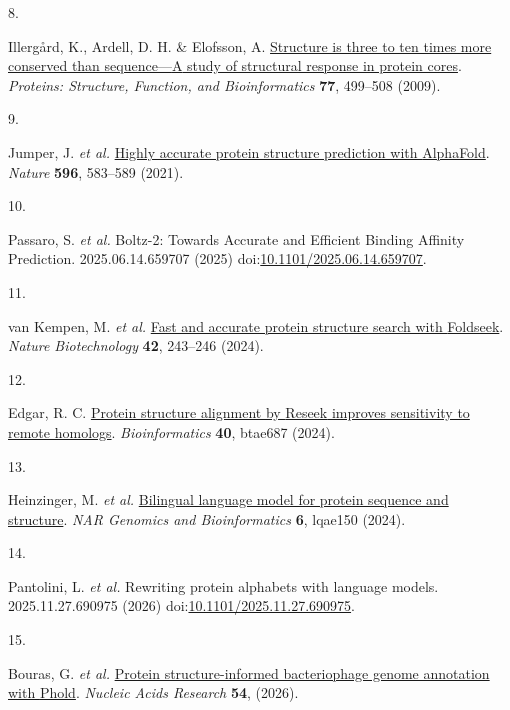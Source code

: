 \documentclass[
  sn-nature,
]{sn-jnl}
\newlength{\cslhangindent}
\newlength{\csllabelwidth}
\newenvironment{CSLReferences}[2] %
 {\begin{list}{}{%
  \setlength{\itemindent}{0pt}
  \setlength{\leftmargin}{0pt}
  \setlength{\parsep}{0pt}
  \ifodd #1
   \setlength{\leftmargin}{\cslhangindent}
   \setlength{\itemindent}{-1\cslhangindent}
  \fi
  \setlength{\itemsep}{#2\baselineskip}}}
 {\end{list}}
\newcommand{\CSLLeftMargin}[1]{\parbox[t]{\csllabelwidth}{\strut#1\strut}}
\newcommand{\CSLRightInline}[1]{\parbox[t]{\linewidth - \csllabelwidth}{\strut#1\strut}}
\begin{document}
\begin{CSLReferences}{0}{0}
\CSLLeftMargin{8. }%
\CSLRightInline{Illergård, K., Ardell, D. H. \& Elofsson, A.
\href{https://doi.org/10.1002/prot.22458}{Structure is three to ten
times more conserved than sequence---{A} study of structural response in
protein cores}. \emph{Proteins: Structure, Function, and Bioinformatics}
\textbf{77}, 499--508 (2009).}

\CSLLeftMargin{9. }%
\CSLRightInline{Jumper, J. \emph{et al.}
\href{https://doi.org/10.1038/s41586-021-03819-2}{Highly accurate
protein structure prediction with {AlphaFold}}. \emph{Nature}
\textbf{596}, 583--589 (2021).}

\CSLLeftMargin{10. }%
\CSLRightInline{Passaro, S. \emph{et al.} Boltz-2: {Towards Accurate}
and {Efficient Binding Affinity Prediction}. 2025.06.14.659707 (2025)
doi:\href{https://doi.org/10.1101/2025.06.14.659707}{10.1101/2025.06.14.659707}.}

\CSLLeftMargin{11. }%
\CSLRightInline{{van Kempen, M. \emph{et al.}}
\href{https://doi.org/10.1038/s41587-023-01773-0}{Fast and accurate
protein structure search with {Foldseek}}. \emph{Nature Biotechnology}
\textbf{42}, 243--246 (2024).}

\CSLLeftMargin{12. }%
\CSLRightInline{Edgar, R. C.
\href{https://doi.org/10.1093/bioinformatics/btae687}{Protein structure
alignment by {Reseek} improves sensitivity to remote homologs}.
\emph{Bioinformatics} \textbf{40}, btae687 (2024).}

\CSLLeftMargin{13. }%
\CSLRightInline{Heinzinger, M. \emph{et al.}
\href{https://doi.org/10.1093/nargab/lqae150}{Bilingual language model
for protein sequence and structure}. \emph{NAR Genomics and
Bioinformatics} \textbf{6}, lqae150 (2024).}

\CSLLeftMargin{14. }%
\CSLRightInline{Pantolini, L. \emph{et al.} Rewriting protein alphabets
with language models. 2025.11.27.690975 (2026)
doi:\href{https://doi.org/10.1101/2025.11.27.690975}{10.1101/2025.11.27.690975}.}

\CSLLeftMargin{15. }%
\CSLRightInline{Bouras, G. \emph{et al.}
\href{https://doi.org/10.1093/nar/gkaf1448}{Protein structure-informed
bacteriophage genome annotation with {Phold}}. \emph{Nucleic Acids
Research} \textbf{54}, (2026).}


\end{CSLReferences}
\end{document}
